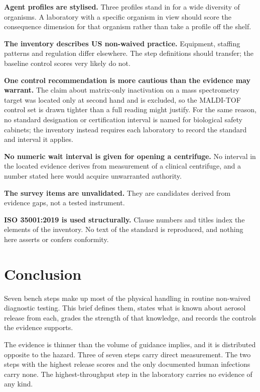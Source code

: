 \textbf{Agent profiles are stylised.} Three profiles stand in for a wide
diversity of organisms. A laboratory with a specific organism in view should
score the consequence dimension for that organism rather than take a profile
off the shelf.

\textbf{The inventory describes US non-waived practice.} Equipment, staffing
patterns and regulation differ elsewhere. The step definitions should transfer;
the baseline control scores very likely do not.

\textbf{One control recommendation is more cautious than the evidence may
warrant.} The claim about matrix-only inactivation on a mass spectrometry
target was located only at second hand and is excluded, so the MALDI-TOF
control set is drawn tighter than a full reading might justify. For the same
reason, no standard designation or certification interval is named for
biological safety cabinets; the inventory instead requires each laboratory to
record the standard and interval it applies.

\textbf{No numeric wait interval is given for opening a centrifuge.} No
interval in the located evidence derives from measurement of a clinical
centrifuge, and a number stated here would acquire unwarranted authority.

\textbf{The survey items are unvalidated.} They are candidates derived from
evidence gaps, not a tested instrument.

\textbf{ISO 35001:2019 is used structurally.} Clause numbers and titles index
the elements of the inventory. No text of the standard is reproduced, and
nothing here asserts or confers conformity.

\section{Conclusion}

Seven bench steps make up most of the physical handling in routine non-waived
diagnostic testing. This brief defines them, states what is known about aerosol
release from each, grades the strength of that knowledge, and records the
controls the evidence supports.

The evidence is thinner than the volume of guidance implies, and it is
distributed opposite to the hazard. Three of seven steps carry direct
measurement. The two steps with the highest release scores and the only
documented human infections carry none. The highest-throughput step in the
laboratory carries no evidence of any kind.

